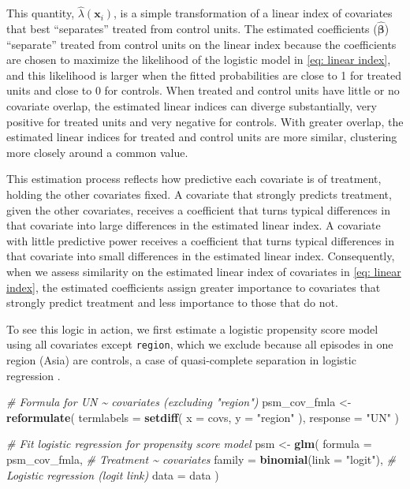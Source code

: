 \documentclass[
  12pt,
  leqno]{article}
\newenvironment{Shaded}{\begin{snugshade}}{\end{snugshade}}
\newcommand{\AttributeTok}[1]{\textcolor[rgb]{0.13,0.29,0.53}{#1}}
\newcommand{\CommentTok}[1]{\textcolor[rgb]{0.56,0.35,0.01}{\textit{#1}}}
\newcommand{\FunctionTok}[1]{\textcolor[rgb]{0.13,0.29,0.53}{\textbf{#1}}}
\newcommand{\NormalTok}[1]{#1}
\newcommand{\OtherTok}[1]{\textcolor[rgb]{0.56,0.35,0.01}{#1}}
\newcommand{\StringTok}[1]{\textcolor[rgb]{0.31,0.60,0.02}{#1}}
\begin{document}
This quantity, \(\hat{\lambda}(\bm{x}_i)\), is a simple transformation
of a linear index of covariates that best ``separates'' treated from
control units. The estimated coefficients (\(\bm{\hat{\beta}}\))
``separate'' treated from control units on the linear index because the
coefficients are chosen to maximize the likelihood of the logistic model
in \eqref{eq: linear index}, and this likelihood is larger when the
fitted probabilities are close to 1 for treated units and close to 0 for
controls. When treated and control units have little or no covariate
overlap, the estimated linear indices can diverge substantially, very
positive for treated units and very negative for controls. With greater
overlap, the estimated linear indices for treated and control units are
more similar, clustering more closely around a common value.

This estimation process reflects how predictive each covariate is of
treatment, holding the other covariates fixed. A covariate that strongly
predicts treatment, given the other covariates, receives a coefficient
that turns typical differences in that covariate into large differences
in the estimated linear index. A covariate with little predictive power
receives a coefficient that turns typical differences in that covariate
into small differences in the estimated linear index. Consequently, when
we assess similarity on the estimated linear index of covariates in
\eqref{eq: linear index}, the estimated coefficients assign greater
importance to covariates that strongly predict treatment and less
importance to those that do not.

To see this logic in action, we first estimate a logistic propensity
score model using all covariates except \texttt{region}, which we
exclude because all episodes in one region (Asia) are controls, a case
of quasi-complete separation in logistic regression
\citep{albertanderson1984}.

\singlespacing

\begin{Shaded}
\begin{Highlighting}[]
\CommentTok{\# Formula for UN \textasciitilde{} covariates (excluding "region")}
\NormalTok{psm\_cov\_fmla }\OtherTok{\textless{}{-}} \FunctionTok{reformulate}\NormalTok{(}
  \AttributeTok{termlabels =} \FunctionTok{setdiff}\NormalTok{(}
    \AttributeTok{x =}\NormalTok{ covs,}
    \AttributeTok{y =} \StringTok{"region"}
\NormalTok{  ),}
  \AttributeTok{response =} \StringTok{"UN"}
\NormalTok{)}

\CommentTok{\# Fit logistic regression for propensity score model}
\NormalTok{psm }\OtherTok{\textless{}{-}} \FunctionTok{glm}\NormalTok{(}
  \AttributeTok{formula =}\NormalTok{ psm\_cov\_fmla,            }\CommentTok{\# Treatment \textasciitilde{} covariates}
  \AttributeTok{family =} \FunctionTok{binomial}\NormalTok{(}\AttributeTok{link =} \StringTok{"logit"}\NormalTok{), }\CommentTok{\# Logistic regression (logit link)}
  \AttributeTok{data =}\NormalTok{ data}
\NormalTok{)}
\end{Highlighting}
\end{Shaded}
\end{document}
